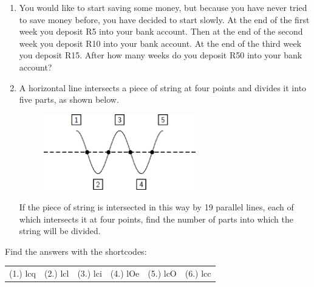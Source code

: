 \begin{enumerate}[noitemsep, label=\textbf{\arabic*}. ]
\begin{figure}[H]
\begin{center}
      \vspace{2pt}
    \vspace{.1in}
    \end{center}
 \end{figure}       
        \label{m39362*uid48}\item You would like to start saving some money, but because you have never tried to save money before, you have decided to start slowly. At the end of the first week you deposit R5 into your bank account. Then at the end of the second week you deposit R10 into your bank account. At the end of the third week you deposit R15. After how many weeks do you deposit R50 into your bank account?
        \label{m39362*uid49}\item A horizontal line intersects a piece of string at
four points and divides it into five parts, as shown below.
    \setcounter{subfigure}{0}
	\begin{figure}[H] %
    \begin{center}
    \label{m39362*id67455!!!underscore!!!media}\label{m39362*id67455!!!underscore!!!printimage}\includegraphics[width=250px]{col11306.imgs/m39362_MG10C7_005.png} %
      \vspace{2pt}
    \vspace{.1in}
    \end{center}
 \end{figure}       
If the piece of string is intersected in this way by 19 parallel
lines, each of which intersects it at four points, find the number
of parts into which the string will be divided.
        \end{enumerate}
  \label{m39362**end}
  \label{d2d281c6991a4da87e4a19596c1ef625**end}
\par {} Find the answers with the shortcodes:
 \par \begin{tabular}[h]{cccccc}
 (1.) lcq  &  (2.) lcl  &  (3.) lci  &  (4.) lOe  &  (5.) lcO  &  (6.) lcc  & \end{tabular}
